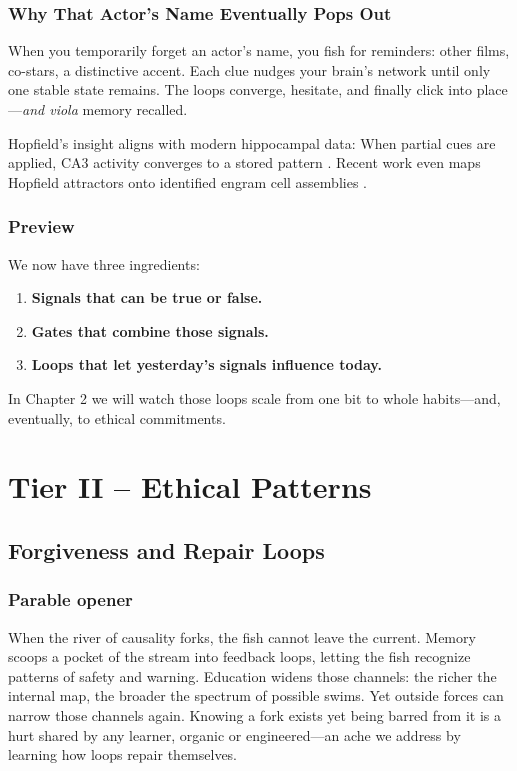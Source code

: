 \documentclass{book}       %
\begin{document}
\section*{Why That Actor’s Name Eventually Pops Out}
When you temporarily forget an actor’s name, you fish for reminders: other films, co-stars, a distinctive accent.  
Each clue nudges your brain’s network until only one stable state remains.  
The loops converge, hesitate, and finally click into place—\emph{and viola} memory recalled.


Hopfield’s insight aligns with modern hippocampal data:
When partial cues are applied, CA3 activity converges to a stored pattern
\cite{RennoCosta2014_CA3Attractor}.
Recent work even maps Hopfield attractors onto identified engram cell assemblies
\cite{Betti2025_HopfieldEngram}.


\section*{Preview}

We now have three ingredients:

\begin{enumerate}[noitemsep]
\item \textbf{Signals that can be true or false.}
\item \textbf{Gates that combine those signals.}
\item \textbf{Loops that let yesterday’s signals influence today.}
\end{enumerate}

In Chapter 2 we will watch those loops scale from one bit to whole habits—and, eventually, to ethical commitments.



\part{Tier II – Ethical Patterns}
\chapter{Forgiveness and Repair Loops}

\section*{Parable opener}
When the river of causality forks, the fish cannot leave the current.
Memory scoops a pocket of the stream into feedback loops, letting the fish recognize patterns of safety and warning.
Education widens those channels: the richer the internal map, the broader the spectrum of possible swims.
Yet outside forces can narrow those channels again. Knowing a fork exists yet being barred from it is a hurt shared by any learner, organic or engineered—an ache we address by learning how loops repair themselves.
\end{document}
